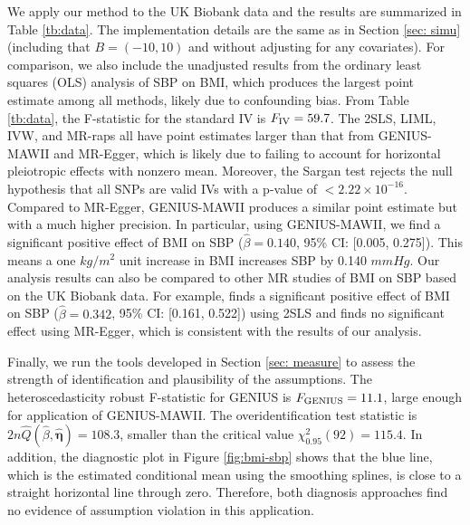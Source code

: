 \documentclass[12pt]{article}
\begin{document}
{We apply our method to the UK Biobank data and the results are summarized in Table \ref{tb:data}. {The implementation details are the same as in Section \ref{sec: simu} (including that $B=(-10,10)$ and without adjusting for any covariates).} {For comparison, we also include the unadjusted results from the ordinary least squares (OLS) analysis of SBP on BMI, which produces the largest point estimate among all methods, likely due to confounding bias.} From Table \ref{tb:data}, the F-statistic for the standard IV is $F_{\rm IV} = 59.7$.  The 2SLS, LIML, IVW, and MR-raps all have point estimates larger than that from GENIUS-MAWII and MR-Egger, which is likely due to failing to account for horizontal pleiotropic effects with nonzero mean. Moreover, the Sargan test \citep{sargan1958estimation} rejects the null hypothesis that all SNPs are valid IVs with a p-value of $< 2.22\times 10^{-16}$. 
Compared to MR-Egger, GENIUS-MAWII produces a similar point estimate but with a much higher precision. In particular, using GENIUS-MAWII, we find a significant positive effect of BMI on SBP ($\hat{\beta}= 0.140$, 95\% CI: [0.005, 0.275]).
This means a  one  $ kg/m^2  $ unit increase in BMI increases SBP by 0.140 $ mmHg $. Our analysis results can also be compared to other MR studies of BMI on SBP based on the UK Biobank data. For example,  \cite{Lyall:2017aa} finds a significant positive effect of BMI on SBP ($\hat{\beta}= 0.342$, 95\% CI: [0.161, 0.522]) using 2SLS and finds no significant effect using MR-Egger, which is consistent with the results of our analysis.

Finally, we run the tools developed in Section \ref{sec: measure} to assess the strength of identification and plausibility of the assumptions. 
The heteroscedasticity robust F-statistic for GENIUS is  {$F_{\rm GENIUS}= 11.1$}, large enough for application of GENIUS-MAWII. The overidentification test statistic is $2n  \hat{Q} (\hat \beta, \hat{\bm \eta})  = 108.3$, smaller than the critical value $\chi^2_{0.95}(92)=115.4 $. In addition, the diagnostic plot in Figure \ref{fig:bmi-sbp} shows that the blue line, which is the estimated conditional mean using the smoothing splines, {is close to a straight horizontal line through zero.} Therefore, both diagnosis
 approaches  find no evidence of assumption violation in this application. 




}
\end{document}

